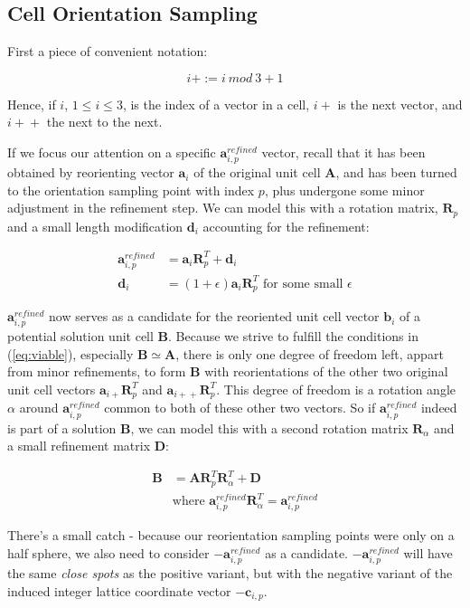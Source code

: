 \documentclass[a4paper,10pt]{article}
\newcommand{\vect}[1]{\mathbf{#1}}
\newcommand{\mat}[1]{\mathbf{#1}}
\begin{document}
\subsection{Cell Orientation Sampling}

First a piece of convenient notation:

\[
 i+ := i\:mod\:3 + 1
\]

Hence, if $i$, $1\leq i\leq 3$, is the index of a vector in a cell, $i+$ is the next vector, and ${i+}+$ the next to the next.

If we focus our attention on a specific $\vect{a}_{i,p}^{refined}$ vector, recall that it has been obtained by reorienting vector $\vect{a}_i$ of the original unit cell $\mat{A}$, and has been turned to the orientation sampling point with index $p$, plus undergone some minor adjustment in the refinement step. We can model this with a rotation matrix, $\mat{R}_p$ and a small length modification $\vect{d}_i$ accounting for the refinement:

\[
 \begin{split}
  \vect{a}_{i,p}^{refined} &= \vect{a}_i \mat{R}_p^T + \vect{d}_i \\
  \vect{d}_i &= (1 + \epsilon)\vect{a}_i \mat{R}_p^T \text{ for some small }\epsilon
 \end{split}
\]

$\vect{a}_{i,p}^{refined}$ now serves as a candidate for the reoriented unit cell vector $\vect{b}_i$ of a potential solution unit cell $\mat{B}$. Because we strive to fulfill the conditions in (\ref{eq:viable}), especially $\mat{B}\simeq \mat{A}$, there is only one degree of freedom left, appart from minor refinements, to form $\mat{B}$ with reorientations of the other two original unit cell vectors $\vect{a}_{i+} \mat{R}_p^T$ and $\vect{a}_{{i+}+} \mat{R}_p^T$. This degree of freedom is a rotation angle $\alpha$ around $\vect{a}_{i,p}^{refined}$ common to both of these other two vectors. So if $\vect{a}_{i,p}^{refined}$ indeed is part of a solution $\mat{B}$, we can model this with a second rotation matrix $\mat{R}_\alpha$ and a small refinement matrix $\mat{D}$:

\[
 \begin{split}
  \mat{B} &= \mat{A} \mat{R}_p^T \mat{R}_\alpha^T + \mat{D} \\
  &\text{where }\vect{a}_{i,p}^{refined}\mat{R}_\alpha^T = \vect{a}_{i,p}^{refined}
 \end{split}
\]

There's a small catch - because our reorientation sampling points were only on a half sphere, we also need to consider $-\vect{a}_{i,p}^{refined}$ as a candidate. $-\vect{a}_{i,p}^{refined}$ will have the same \emph{close spots} as the positive variant, but with the negative variant of the induced integer lattice coordinate vector $-\vect{c}_{i,p}$.
\end{document}
